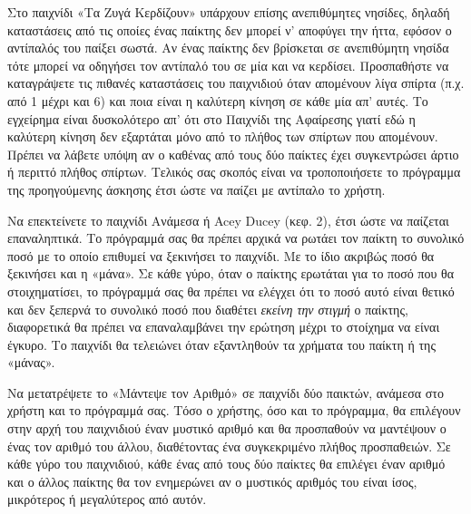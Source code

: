 \documentclass[a4paper,11pt,oneside]{book}
\begin{document}
{{{\begin{exercise}
Στο παιχνίδι «Τα Ζυγά Κερδίζουν» υπάρχουν επίσης ανεπιθύμητες νησίδες, δηλαδή καταστάσεις από τις οποίες ένας παίκτης δεν μπορεί ν' αποφύγει την ήττα, εφόσον ο αντίπαλός του παίξει σωστά. Αν ένας παίκτης δεν βρίσκεται σε ανεπιθύμητη νησίδα τότε μπορεί να οδηγήσει τον αντίπαλό του σε μία και να κερδίσει. Προσπαθήστε να καταγράψετε τις πιθανές καταστάσεις του παιχνιδιού όταν απομένουν λίγα σπίρτα (π.χ. από 1 μέχρι και 6) και ποια είναι η καλύτερη κίνηση σε κάθε μία απ' αυτές. Το εγχείρημα είναι δυσκολότερο απ' ότι στο Παιχνίδι της Αφαίρεσης γιατί εδώ η καλύτερη κίνηση δεν εξαρτάται μόνο από το πλήθος των σπίρτων που απομένουν. Πρέπει να λάβετε υπόψη αν ο καθένας από τους δύο παίκτες έχει συγκεντρώσει άρτιο ή περιττό πλήθος σπίρτων. Τελικός σας σκοπός είναι να τροποποιήσετε το πρόγραμμα της προηγούμενης άσκησης έτσι ώστε να παίζει με αντίπαλο το χρήστη.
\end{exercise}

\begin{exercise}
Να επεκτείνετε το παιχνίδι Ανάμεσα ή Acey Ducey (κεφ. 2), έτσι ώστε να παίζεται επαναληπτικά. Το πρόγραμμά σας θα πρέπει αρχικά να ρωτάει τον παίκτη το συνολικό ποσό με το οποίο επιθυμεί να ξεκινήσει το παιχνίδι. Με το ίδιο ακριβώς ποσό θα ξεκινήσει και η «μάνα». Σε κάθε γύρο, όταν ο παίκτης ερωτάται για το ποσό που θα στοιχηματίσει, το πρόγραμμά σας θα πρέπει να ελέγχει ότι το ποσό αυτό είναι θετικό και δεν ξεπερνά το συνολικό ποσό που διαθέτει \emph{εκείνη την στιγμή} ο παίκτης, διαφορετικά θα πρέπει να επαναλαμβάνει την ερώτηση μέχρι το στοίχημα να είναι έγκυρο. Το παιχνίδι θα τελειώνει όταν εξαντληθούν τα χρήματα του παίκτη ή της «μάνας». 
\end{exercise}

\begin{exercise}
Να μετατρέψετε το «Μάντεψε τον Αριθμό» σε παιχνίδι δύο παικτών, ανάμεσα στο χρήστη και το πρόγραμμά σας. Τόσο ο χρήστης, όσο και το πρόγραμμα, θα επιλέγουν στην αρχή του παιχνιδιού έναν μυστικό αριθμό και θα προσπαθούν να μαντέψουν ο ένας τον αριθμό του άλλου, διαθέτοντας ένα συγκεκριμένο πλήθος προσπαθειών. Σε κάθε γύρο του παιχνιδιού, κάθε ένας από τους δύο παίκτες θα επιλέγει έναν αριθμό και ο άλλος παίκτης θα τον ενημερώνει αν ο μυστικός αριθμός του είναι ίσος, μικρότερος ή μεγαλύτερος από αυτόν. 


\end{exercise}}}}
\end{document}
